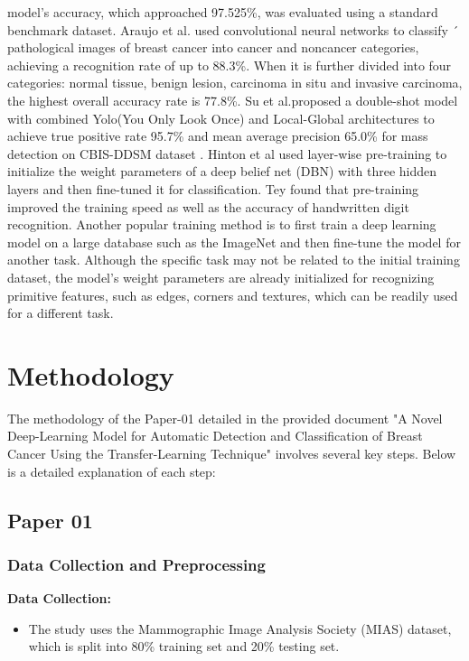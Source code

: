 \documentclass[12]{article}
\begin{document}
model’s accuracy, which approached 97.525\%, was evaluated
using a standard benchmark dataset.
\newline
Araujo et al.\cite{araujo2017classification} used convolutional neural networks to classify ´
pathological images of breast cancer into cancer and noncancer categories, achieving a recognition rate of up to 88.3\%.
When it is further divided into four categories: normal tissue,
benign lesion, carcinoma in situ and invasive carcinoma, the
highest overall accuracy rate is 77.8\%. Su et al.\cite{su2022yolo}proposed
a double-shot model with combined Yolo(You Only Look
Once) and Local-Global architectures to achieve true positive rate 95.7\% and mean average precision 65.0\% for
mass detection on CBIS-DDSM dataset .
\newline
Hinton et al \cite{hinton2006fast}used layer-wise pre-training to initialize 
the weight parameters of a deep belief net (DBN) with three hidden layers and then fine-tuned it for classification. 
Tey found that pre-training improved the training speed as well as the accuracy of handwritten digit recognition. Another popular training method is to first train a deep learning model on a large database such as the 
ImageNet \cite{russakovsky2015imagenet} and then fine-tune the model for another task. Although the specific task may not be related to the 
initial training dataset, the model’s weight parameters are already initialized for recognizing primitive features, 
such as edges, corners and textures, which can be readily used for a different task. 


\section{Methodology}



The methodology of the Paper-01 detailed in the provided document "A Novel Deep-Learning Model for Automatic Detection and Classification of Breast Cancer Using the Transfer-Learning Technique" involves several key steps. Below is a detailed explanation of each step:
\subsection{Paper 01}
\subsubsection{Data Collection and Preprocessing}

\textbf{Data Collection:}
\begin{itemize}
    \item The study uses the Mammographic Image Analysis Society (MIAS) dataset, which is split into 80\% training set and 20\% testing set.
\end{itemize}
\end{document}
